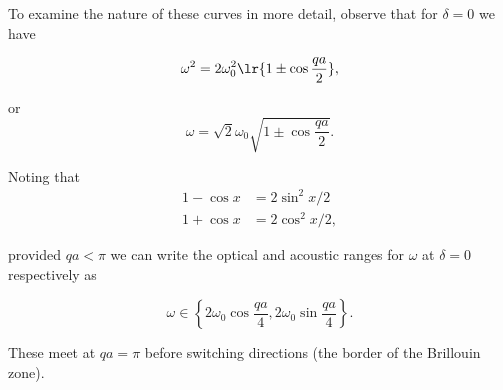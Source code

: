 {To examine the nature of these curves in more detail, observe that for $\delta = 0$ we have

\begin{dmath}\label{eqn:condensedMatterProblemSet4Problem2:820}
\omega^2 = 2 \omega_0^2 \lr{ 1 \pm \cos \frac{qa}{2} },
\end{dmath}

or
\begin{dmath}\label{eqn:condensedMatterProblemSet4Problem2:840}
\omega = \sqrt{2} \omega_0 \sqrt{ 1 \pm \cos \frac{qa}{2} }.
\end{dmath}

Noting that 
\begin{equation}\label{eqn:condensedMatterProblemSet4Problem2:860}
\begin{aligned}
1 - \cos x &= 2 \sin^2 x/2 \\
1 + \cos x &= 2 \cos^2 x/2,
\end{aligned}
\end{equation}

provided $qa < \pi$ we can write the optical and acoustic ranges for $\omega$ at $\delta = 0$ respectively as

\begin{dmath}\label{eqn:condensedMatterProblemSet4Problem2:880}
\omega \in \left\{ 
2 \omega_0 \cos \frac{qa}{4},
2 \omega_0 \sin \frac{qa}{4}
 \right\}.
\end{dmath}

These meet at $qa = \pi$ before switching directions (the border of the Brillouin zone).
}
